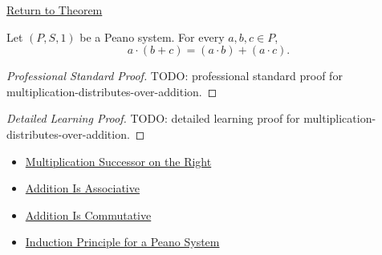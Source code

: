 \newpage
{}
\label{prf:multiplication-distributes-over-addition}

\begin{remark*}[Return]
\hyperref[thm:multiplication-distributes-over-addition]{Return to Theorem}
\end{remark*}

\begin{theorem*}
Let $(P,S,1)$ be a Peano system. For every $a,b,c \in P$,
\[
a \cdot (b+c) = (a \cdot b) + (a \cdot c).
\]
\end{theorem*}

\begin{proof}[Professional Standard Proof]
\LRAProofBodyStart
TODO: professional standard proof for multiplication-distributes-over-addition.
\end{proof}

\begin{proof}[Detailed Learning Proof]
\LRAProofBodyStart
TODO: detailed learning proof for multiplication-distributes-over-addition.
\end{proof}

\begin{remark*}
\end{remark*}

\begin{dependencies}
\begin{itemize}
  \item \hyperref[thm:multiplication-successor-on-right]{Multiplication Successor on the Right}
  \item \hyperref[thm:addition-associative]{Addition Is Associative}
  \item \hyperref[thm:addition-commutative]{Addition Is Commutative}
  \item \hyperref[thm:induction-principle-for-peano-system]{Induction Principle for a Peano System}
\end{itemize}
\end{dependencies}

\clearpage
